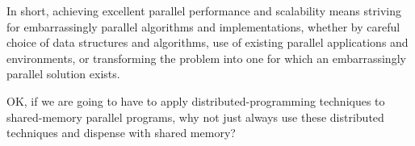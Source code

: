 In short, achieving excellent parallel performance and scalability means
striving for embarrassingly parallel algorithms and implementations,
whether by careful choice of data structures and algorithms, use of
existing parallel applications and environments, or transforming the
problem into one for which an embarrassingly parallel solution exists.

\QuickQuiz{}
	OK, if we are going to have to apply distributed-programming
	techniques to shared-memory parallel programs, why not just
	always use these distributed techniques and dispense with
	shared memory?
 \QuickQuizEnd
